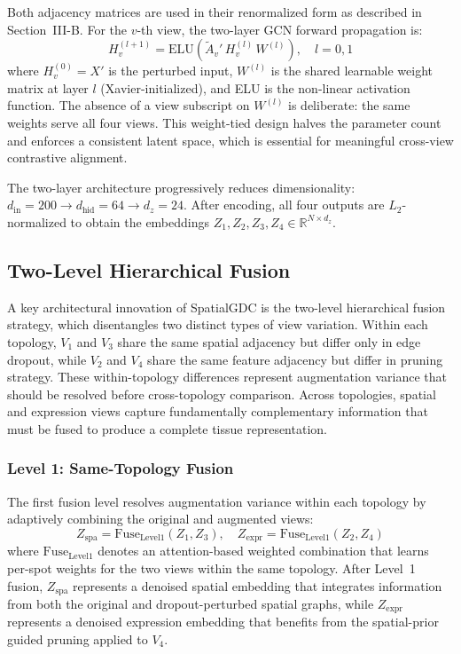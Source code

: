\documentclass[lettersize,journal]{IEEEtran}
\begin{document}
Both adjacency matrices are used in their renormalized form as described in Section~III-B. For the $v$-th view, the two-layer GCN forward propagation is:
\begin{equation}
    H_v^{(l+1)} = \text{ELU}\left( \tilde{A}_v' \, H_v^{(l)} \, W^{(l)} \right), \quad l = 0, 1
\end{equation}
where $H_v^{(0)} = X'$ is the perturbed input, $W^{(l)}$ is the shared learnable weight matrix at layer $l$ (Xavier-initialized), and ELU is the non-linear activation function. The absence of a view subscript on $W^{(l)}$ is deliberate: the same weights serve all four views. This weight-tied design halves the parameter count and enforces a consistent latent space, which is essential for meaningful cross-view contrastive alignment.

The two-layer architecture progressively reduces dimensionality: $d_{\text{in}} = 200 \to d_{\text{hid}} = 64 \to d_{z} = 24$. After encoding, all four outputs are $L_2$-normalized to obtain the embeddings $Z_1, Z_2, Z_3, Z_4 \in \mathbb{R}^{N \times d_z}$.

\subsection{Two-Level Hierarchical Fusion}
\label{sec:fusion}

A key architectural innovation of SpatialGDC is the two-level hierarchical fusion strategy, which disentangles two distinct types of view variation. Within each topology, $V_1$ and $V_3$ share the same spatial adjacency but differ only in edge dropout, while $V_2$ and $V_4$ share the same feature adjacency but differ in pruning strategy. These within-topology differences represent augmentation variance that should be resolved before cross-topology comparison. Across topologies, spatial and expression views capture fundamentally complementary information that must be fused to produce a complete tissue representation.

\subsubsection{Level 1: Same-Topology Fusion}
The first fusion level resolves augmentation variance within each topology by adaptively combining the original and augmented views:
\begin{equation}
    Z_{\text{spa}} = \text{Fuse}_{\text{Level1}}(Z_1, Z_3), \quad Z_{\text{expr}} = \text{Fuse}_{\text{Level1}}(Z_2, Z_4)
\end{equation}
where $\text{Fuse}_{\text{Level1}}$ denotes an attention-based weighted combination that learns per-spot weights for the two views within the same topology. After Level~1 fusion, $Z_{\text{spa}}$ represents a denoised spatial embedding that integrates information from both the original and dropout-perturbed spatial graphs, while $Z_{\text{expr}}$ represents a denoised expression embedding that benefits from the spatial-prior guided pruning applied to $V_4$.
\end{document}
